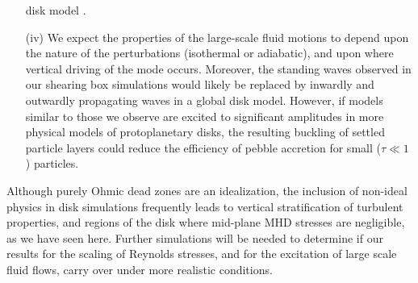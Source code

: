 \begin{itemize}
disk model \citep{lubow93}.
\item[(iv)]
We expect the properties of the large-scale fluid motions to depend upon the nature of the perturbations 
(isothermal or adiabatic), and upon where vertical driving of the mode occurs. Moreover, the standing waves 
observed in our shearing box simulations would likely be replaced by inwardly and outwardly propagating waves 
in a global disk model. However, 
if models similar to those we observe are excited to significant amplitudes in more physical models of protoplanetary disks, the 
resulting buckling of settled particle layers could reduce the efficiency of pebble accretion for small ($\tau \ll 1$) particles. 
\end{itemize}

Although purely Ohmic dead zones are an idealization, the inclusion of 
non-ideal physics in disk simulations frequently leads to vertical stratification of turbulent properties, and regions of the 
disk where mid-plane MHD stresses are negligible, as we have seen here.  Further simulations will be needed 
to determine if our results for the scaling of Reynolds stresses, and for the excitation of large scale 
fluid flows, carry over under more realistic conditions.